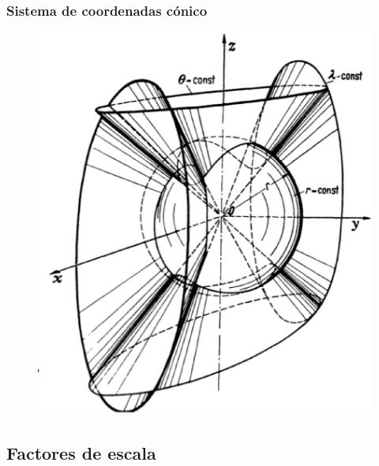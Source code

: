 \begin{frame}
\frametitle{Sistema de coordenadas cónico}
\begin{figure}[H]
   \centering
   \includegraphics[scale=0.3]{Imagenes/Sistema_Conico.eps}
\end{figure}
\end{frame}

\subsection{Factores de escala}

